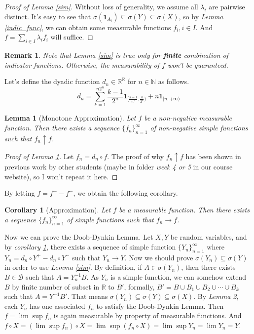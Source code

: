 \documentclass[12pt]{article}
\newcommand\bN{\mathbb{N}}
\newcommand\bR{\mathbb{R}}
\newcommand{\ind}[1]{\mathbf{1}_{#1}}
\newtheorem{lemma}{Lemma}
\newtheorem{corollary}{Corollary}
\newtheorem{remark}{Remark}
\begin{document}
	\begin{proof}[Proof of Lemma \ref{sim}]
		Without loss of generality, we assume all $\lambda_i$ are pairwise distinct. It's easy to see that $\sigma(\ind{A_i})\subseteq\sigma(Y)\subseteq \sigma(X)$, so by \textit{Lemma \ref{indic_func}}, we can obtain some measurable functions $f_i,i\in I$. And $f=\sum_{i\in I} \lambda_i f_i$ will suffice.
	\end{proof}

	\begin{remark}
		Note that \textit{Lemma \ref{sim}} is true only for \textbf{finite} combination of indicator functions. Otherwise, the measurability of $f$ won't be guaranteed.
	\end{remark}

	Let's define the dyadic function $d_n\in\bR^{\bR}$ for $n\in \bN$ as follows.
	$$d_n=\sum_{k=1}^{n2^n}\frac{k-1}{2^n}\ind{[\frac{k-1}{n^2},\frac{k}{2^n})}+n\ind{[n,+\infty)}$$
	
	\begin{lemma}[Monotone Approximation]\label{ma}
		Let $f$ be a non-negative measurable function. Then there exists a sequence $\{f_n\}_{n=1}^\infty$ of non-negative simple functions such that $f_n\uparrow f$.
	\end{lemma}

	\begin{proof}[Proof of Lemma \ref{ma}]
		Let $f_n=d_n\circ f$. The proof of why $f_n\uparrow f$ has been shown in previous work by other students (maybe in folder \textit{week 4 or 5} in our course website), so I won't repeat it here.
	\end{proof}

	By letting $f=f^+-f^-$, we obtain the following corollary.

	\begin{corollary}[Approximation]\label{app}
		Let $f$ be a measurable function. Then there exists a sequence $\{f_n\}_{n=1}^\infty$ of simple functions such that $f_n\rightarrow f$.
	\end{corollary}

	Now we can prove the Doob-Dynkin Lemma. Let $X,Y$ be random variables, and by \textit{corollary \ref{app}}, there exists a sequence of simple function $\{Y_n\}_{n=1}^\infty$ where $Y_n=d_n\circ Y^+-d_n\circ Y^-$ such that $Y_n\rightarrow Y$. Now we should prove $\sigma(Y_n)\subseteq\sigma(Y)$ in order to use \textit{Lemma \ref{sim}}. By definition, if $A\in \sigma(Y_n)$, then there exists $B\in \mathcal{B}$ such that $A=Y_n^{-1}B$. As $Y_n$ is a simple function, we can somehow extend $B$ by finite number of subset in $\bR$ to $B'$, formally, $B'=B\cup B_1\cup B_2\cup\cdots \cup B_k$ such that $A=Y^{-1}B'$. That means $\sigma(Y_n)\subseteq\sigma(Y)\subseteq\sigma(X)$. By \textit{Lemma 2}, each $Y_n$ has one associated $f_n$ to satisfy the Doob-Dynkin Lemma. Then $f=\lim\sup f_n$ is again measurable by property of measurable functions. And $f\circ X=(\lim\sup f_n)\circ X=\lim\sup(f_n\circ X)=\lim \sup Y_n=\lim Y_n=Y$.
	
	
	
\end{document}
